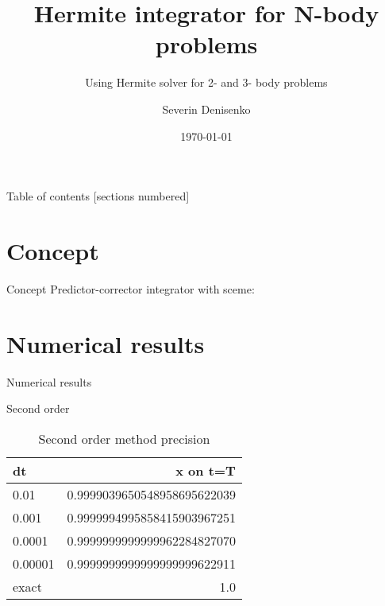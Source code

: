 \documentclass[10pt]{beamer}
\title{Hermite integrator for N-body problems}
\subtitle{Using Hermite solver for 2- and 3- body problems}
\date{\today}
\author{Severin Denisenko}
\institute{Saint Petersburg State University}
\begin{document}
\maketitle

\begin{frame}{Table of contents}
  [sections numbered]
  \tableofcontents%
\end{frame}

\section[Concept]{Concept}

\begin{frame}{Concept}
    Predictor-corrector integrator with sceme:
\end{frame}

\section{Numerical results}

\begin{frame}{Numerical results}
  \begin{figure}
  \end{figure}
\end{frame}

\begin{frame}{Second order}
  \begin{table}
    \caption{Second order method precision}
    \begin{tabular}{lr}
      \toprule
      dt & x on t=T\\
      \midrule
      0.01 & 0.9999039650548958695622039\\
      0.001 & 0.9999994995858415903967251\\
      0.0001 & 0.9999999999999962284827070\\
      0.00001 & 0.9999999999999999999622911\\
      \midrule
      exact & 1.0 \\
      \bottomrule
    \end{tabular}
  \end{table}
\end{frame}
\end{document}
